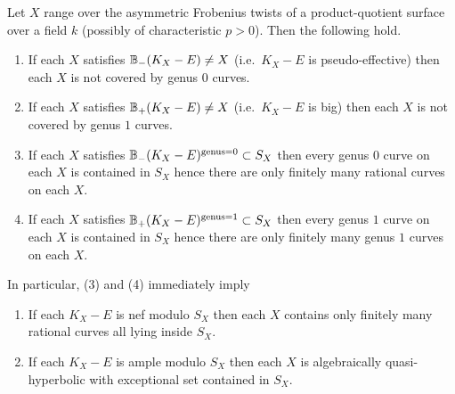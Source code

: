 \documentclass[main.tex]{subfiles}
\begin{document}
\begin{theorem} \label{thm:quasi-hyperbolic_criterion}
Let $X$ range over the asymmetric Frobenius twists of a product-quotient surface over a field $k$ (possibly of characteristic $p > 0$). Then the following hold.
\begin{enumerate}
\item[(1)] If each $X$ satisfies $\mathbb{B}_{-}(K_X - E) \neq X$ (i.e.\ $K_X - E$ is pseudo-effective) then each $X$ is not covered by genus $0$ curves.
\item[(2)] If each $X$ satisfies $\mathbb{B}_{+}(K_X - E) \neq X$ (i.e.\ $K_X - E$ is big) then each $X$ is not covered by genus $1$ curves.
\item[(3)] If each $X$ satisfies $\mathbb{B}_{-}(K_X - E)^{\mathrm{genus} = 0} \subset S_X$ then every genus $0$ curve on each $X$ is contained in $S_X$ hence there are only finitely many rational curves on each $X$.
\item[(4)] If each $X$ satisfies $\mathbb{B}_{+}(K_X - E)^{\mathrm{genus} = 1} \subset S_X$ then every genus $1$ curve on each $X$ is contained in $S_X$ hence there are only finitely many genus $1$ curves on each $X$.
\end{enumerate}
In particular, (3) and (4) immediately imply
\begin{enumerate}
\item If each $K_X - E$ is nef modulo $S_X$ then each $X$ contains only finitely many rational curves all lying inside $S_X$. 
\item If each $K_X - E$ is ample modulo $S_X$ then each $X$ is algebraically quasi-hyperbolic with exceptional set contained in $S_X$. 
\end{enumerate}
\end{theorem}
\end{document}
